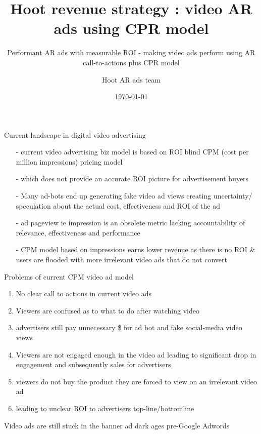\documentclass[12pt]{beamer}
\title{ Hoot revenue strategy : video AR ads using CPR model}
\subtitle{Performant AR ads with measurable ROI  - making video ads perform using AR call-to-actions plus CPR model}
\date{\today}
\author{Hoot AR ads team}
\institute{Hoot Live inc., a Delaware C-corp}
\begin{document}
\maketitle



\begin{frame}[fragile]{Current landscape in digital video advertising}
  \begin{itemize}[<+-| alert@+>]%
	  
\item[-]current video advertising biz model is based on ROI blind CPM (cost per million impressions) pricing model
\item[-]which does not provide an accurate ROI picture for advertisement buyers
\item[-]Many ad-bots end up generating fake video ad views creating uncertainty/ speculation about the actual cost, effectiveness and ROI of the ad
\item[-]ad pageview ie impression is an obsolete metric lacking accountability of relevance, effectiveness and performance 
\item[-]CPM model based on impressions earns lower revenue as there is no ROI \& users are flooded with more irrelevant video ads that do not convert
\end{itemize}

\end{frame}
\begin{frame}[t]{Problems of current CPM video ad model}
\begin{enumerate}[<+-| alert@+>]
\item No clear call to actions in current video ads
\item Viewers are confused as to what to do after watching video
\item advertisers still pay unnecessary \$ for ad bot  and fake social-media video views
\item Viewers are not engaged enough in the video ad leading to  significant drop in engagement and subsequently sales for advertisers
\item viewers do not buy the product they are forced to view on an irrelevant video ad
\item leading to unclear ROI to advertisers top-line/bottomline

\end{enumerate}
\pause
Video ads are still stuck in the banner ad dark ages pre-Google Adwords

\end{frame}
\end{document}
